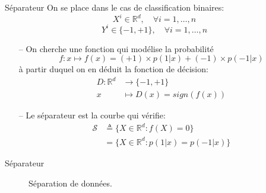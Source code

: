 \documentclass[9pt]{beamer}
\begin{document}
	\begin{frame}{Séparateur}
		On se place dans le cas de classification binaires:
		$$ X^i \in \mathbb{R}^d , \quad \forall i=1,\dots,n$$
		$$ Y^i \in \{-1, +1\} , \quad \forall i=1,\dots,n$$
		\begin{itemize}
			\item[--]On cherche une fonction qui modélise la probabilité
			$$f: x \mapsto f(x) = (+1) \times p(1\vert x) + (-1) \times p(-1\vert x)$$
			à partir duquel on en déduit la fonction de décision:
			\begin{align*}
				D: \mathbb{R}^d &\rightarrow \{-1, +1\} \\
				x &\mapsto D(x) = sign(f(x))
			\end{align*}
			\item[--] Le séparateur est la courbe qui vérifie:
			\begin{align*}
				\mathscr{S} &\triangleq \{X \in \mathbb{R}^d: f(X) = 0\} \\
							&= \{X \in \mathbb{R}^d: p(1\vert x) = p(-1\vert x)\}
			\end{align*}
		\end{itemize}
	\end{frame}

	\begin{frame}{Séparateur}
		\begin{figure}[H]
			{
				\caption{\label{fig::separators} Séparation de données.}
			}
		\end{figure}
	\end{frame}
\end{document}
